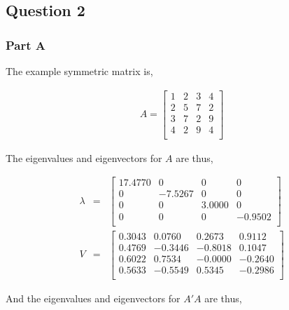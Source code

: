 \newpage
\subsection{Question 2}
\subsubsection{Part A}

The example symmetric matrix is,

\begin{eqnarray}
  A = 
  \begin{bmatrix}
     1 &    2 &    3 &    4 \\
     2 &    5 &    7 &    2 \\
     3 &    7 &    2 &    9 \\
     4 &    2 &    9 &    4 \\    
  \end{bmatrix}
\end{eqnarray}

The eigenvalues and eigenvectors for \(A\) are thus,

\begin{eqnarray}
  \lambda &=&
  \begin{bmatrix}
   17.4770 &        0 &        0 &        0 \\
         0 &  -7.5267 &        0 &        0 \\
         0 &        0 &   3.0000 &        0 \\
         0 &        0 &        0 &  -0.9502 \\
  \end{bmatrix}
  \\
  V &=&
  \begin{bmatrix}
    0.3043 &   0.0760 &   0.2673 &   0.9112 \\
    0.4769 &  -0.3446 &  -0.8018 &   0.1047 \\
    0.6022 &   0.7534 &  -0.0000 &  -0.2640 \\
    0.5633 &  -0.5549 &   0.5345 &  -0.2986 \\
  \end{bmatrix}
\end{eqnarray}

And the eigenvalues and eigenvectors for \(A'A\) are thus,

